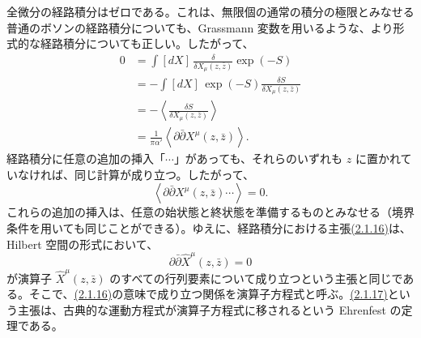 全微分の経路積分はゼロである。これは、無限個の通常の積分の極限とみなせる普通のボソンの経路積分についても、Grassmann 変数を用いるような、より形式的な経路積分についても正しい。したがって、
\begin{equation}
\begin{aligned}
0&=\int[dX]\,\frac{\delta}{\delta X_\mu(z,\bar z)}\exp(-S)\\
&=-\int[dX]\,\exp(-S)\frac{\delta S}{\delta X_\mu(z,\bar z)}\\
&=-\left\langle\frac{\delta S}{\delta X_\mu(z,\bar z)}\right\rangle\\
&=\frac{1}{\pi\alpha'}\left\langle\partial\bar\partial X^\mu(z,\bar z)\right\rangle.
\end{aligned}
\tag{2.1.15}\label{eq:2.1.15}
\end{equation}
経路積分に任意の追加の挿入「$\cdots$」があっても、それらのいずれも $z$ に置かれていなければ、同じ計算が成り立つ。したがって、
\begin{equation}
\left\langle\partial\bar\partial X^\mu(z,\bar z)\cdots\right\rangle=0.
\tag{2.1.16}\label{eq:2.1.16}
\end{equation}
これらの追加の挿入は、任意の始状態と終状態を準備するものとみなせる（境界条件を用いても同じことができる）。ゆえに、経路積分における主張\hyperref[eq:2.1.16]{(2.1.16)}は、Hilbert 空間の形式において、
\begin{equation}
\partial\bar\partial\widehat X^\mu(z,\bar z)=0
\tag{2.1.17}\label{eq:2.1.17}
\end{equation}
が演算子 $\widehat X^\mu(z,\bar z)$ のすべての行列要素について成り立つという主張と同じである。そこで、\hyperref[eq:2.1.16]{(2.1.16)}の意味で成り立つ関係を演算子方程式と呼ぶ。\hyperref[eq:2.1.17]{(2.1.17)}という主張は、古典的な運動方程式が演算子方程式に移されるという Ehrenfest の定理である。

